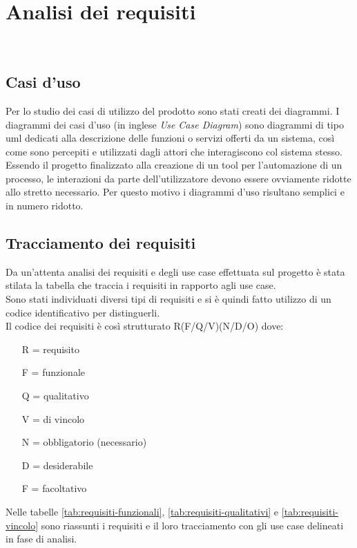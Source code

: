 
\chapter{Analisi dei requisiti}
\label{cap:analisi-requisiti}

\\

\section{Casi d'uso}

Per lo studio dei casi di utilizzo del prodotto sono stati creati dei diagrammi.
I diagrammi dei casi d'uso (in inglese \emph{Use Case Diagram}) sono diagrammi di tipo \gls{uml} dedicati alla descrizione delle funzioni o servizi offerti da un sistema, così come sono percepiti e utilizzati dagli attori che interagiscono col sistema stesso.
Essendo il progetto finalizzato alla creazione di un tool per l'automazione di un processo, le interazioni da parte dell'utilizzatore devono essere ovviamente ridotte allo stretto necessario. Per questo motivo i diagrammi d'uso risultano semplici e in numero ridotto.










\section{Tracciamento dei requisiti}

Da un'attenta analisi dei requisiti e degli use case effettuata sul progetto è stata stilata la tabella che traccia i requisiti in rapporto agli use case.\\
Sono stati individuati diversi tipi di requisiti e si è quindi fatto utilizzo di un codice identificativo per distinguerli.\\
Il codice dei requisiti è così strutturato R(F/Q/V)(N/D/O) dove:
\begin{enumerate}
  \item[R =] requisito
  \item[F =] funzionale
  \item[Q =] qualitativo
  \item[V =] di vincolo
  \item[N =] obbligatorio (necessario)
  \item[D =] desiderabile
  \item[F =] facoltativo
\end{enumerate}
Nelle tabelle \ref{tab:requisiti-funzionali}, \ref{tab:requisiti-qualitativi} e \ref{tab:requisiti-vincolo} sono riassunti i requisiti e il loro tracciamento con gli use case delineati in fase di analisi.

